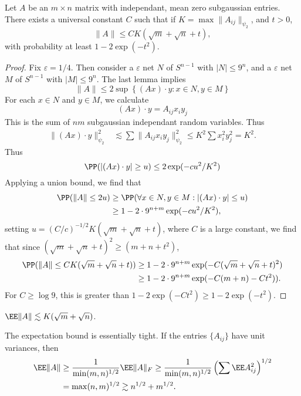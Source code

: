 \begin{theorem}
    Let $A$ be an $m \times n$ matrix with independant, mean zero subgaussian entries. There exists a universal constant $C$ such that if $K = \max \| A_{ij} \|_{\psi_2}$, and $t > 0$,
    \[ \| A \| \leq C K (\sqrt{m} + \sqrt{n} + t), \]
    with probability at least $1 - 2\exp(-t^2)$.
\end{theorem}
\begin{proof}
    Fix $\varepsilon = 1/4$. Then consider a $\varepsilon$ net $N$ of $S^{n-1}$ with $|N| \leq 9^n$, and a $\varepsilon$ net $M$ of $S^{n-1}$ with $|M| \leq 9^n$. The last lemma implies
    \[ \| A \| \leq 2 \sup \left\{ (Ax) \cdot y : x \in N, y \in M \right\} \]
    For each $x \in N$ and $y \in M$, we calculate
    \[ (Ax) \cdot y = A_{ij} x_i y_j \]
    This is the sum of $nm$ subgaussian independant random variables. Thus
    \begin{align*}
        \| (Ax) \cdot y \|_{\psi_2}^2 &\lesssim \sum \| A_{ij} x_i y_j \|_{\psi_2}^2 \leq K^2 \sum x_i^2 y_j^2 = K^2.
    \end{align*}
    Thus
    \[ \PP(|(Ax) \cdot y| \geq u) \leq 2 \exp(-cu^2/K^2) \]
    Applying a union bound, we find that
    \begin{align*}
        \PP( \| A \| \leq 2u ) &\geq \PP(\forall x \in N, y \in M: |(Ax) \cdot y| \leq u)\\
        &\geq 1 - 2 \cdot 9^{n+m} \exp(-cu^2/K^2),
    \end{align*}
    setting $u = (C/c)^{-1/2} K(\sqrt{m} + \sqrt{n} + t)$, where $C$ is a large constant, we find that since $(\sqrt{m} + \sqrt{n} + t)^2 \geq (m + n + t^2)$,
    \begin{align*}
        \PP( \| A \| \leq CK(\sqrt{m} + \sqrt{n} + t)) &\geq 1 - 2 \cdot 9^{n+m} \exp(-C (\sqrt{m} + \sqrt{n} + t)^2)\\
        &\geq 1 - 2 \cdot 9^{n+m} \exp(-C(m + n) - Ct^2)).
    \end{align*}
    For $C \geq \log 9$, this is greater than $1 - 2 \exp(-Ct^2) \geq 1 - 2 \exp(-t^2)$.
\end{proof}

\begin{corollary}
    $\EE \| A \| \lesssim K (\sqrt{m} + \sqrt{n})$.
\end{corollary}

\begin{remark}
    The expectation bound is essentially tight. If the entries $\{ A_{ij} \}$ have unit variances, then
    \begin{align*}
        \EE \| A \| &\geq \frac{1}{\min(m,n)^{1/2}} \EE \| A \|_F \geq \frac{1}{\min(m,n)^{1/2}} \left(\sum \EE A_{ij}^2 \right)^{1/2}\\
        &= \max(n,m)^{1/2} \gtrsim n^{1/2} + m^{1/2}.
    \end{align*}
\end{remark}

